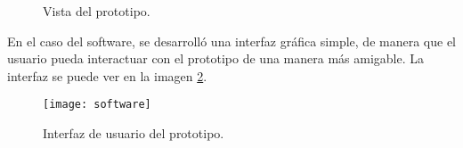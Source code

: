 \begin{figure}[H]
	\begin{center}
	\end{center}
	\label{hardwareda}
	\caption{Vista del prototipo.}
\end{figure} 

En el caso del software, se desarroll\'o una interfaz gr\'afica simple, de manera que el usuario pueda interactuar con el prototipo de una manera m\'as amigable. La interfaz se puede ver en la imagen \ref{software}.

\begin{figure}[H]
	\begin{center}
		\texttt{[image: software]}
	\end{center}
	\caption{Interfaz de usuario del prototipo.}
	\label{software}
\end{figure} 
